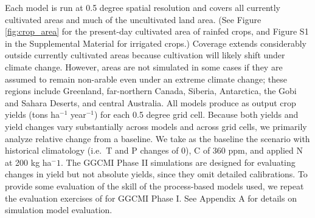 \documentclass[gmd, manuscript]{copernicus} %
\begin{document}
Each model is run at 0.5 degree spatial resolution and covers all currently cultivated areas and much of the uncultivated land area. (See Figure \ref{fig:crop_area} for the present-day cultivated area of rainfed crops, and Figure S1 in the Supplemental Material for irrigated crops.)  Coverage extends considerably outside currently cultivated areas because cultivation will likely shift under climate change.  However, areas are not simulated in some cases if they are assumed to remain non-arable even under an extreme climate change; these regions include Greenland, far-northern Canada, Siberia, Antarctica, the Gobi and Sahara Deserts, and central Australia. All models produce as output crop yields (tons ha$^{-1}$ year$^{-1}$) for each 0.5 degree grid cell. Because both yields and yield changes vary substantially across models and across grid cells, we primarily analyze relative change from a baseline. We take as the baseline the scenario with historical climatology (i.e.\ T and P changes of 0), C of 360 ppm, and applied N at 200 kg ha$^-1$. The GGCMI Phase II simulations are designed for evaluating changes in yield but not absolute yields, since they omit detailed calibrations. To provide some evaluation of the skill of the process-based models used, we repeat the evaluation exercises of \citet{muller_global_2017} for GGCMI Phase I. See Appendix A for details on simulation model evaluation.

\end{document}
